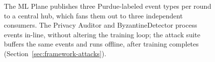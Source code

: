 \begin{figure}[t]

\caption{The ML Plane publishes three Purdue-labeled event types per
round to a central hub, which fans them out to three independent
consumers. The Privacy Auditor and ByzantineDetector process events
in-line, without altering the training loop; the attack suite buffers
the same events and runs offline, after training completes
(Section~\ref{sec:framework-attacks}).}
\label{fig:mlplane}
\end{figure}